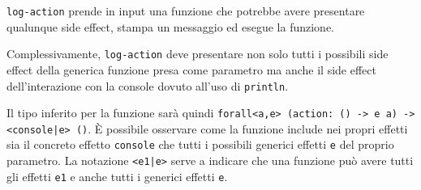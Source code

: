 \lstinline{log-action} prende in input una funzione che potrebbe avere presentare qualunque side effect, stampa un messaggio ed esegue la funzione.

Complessivamente, \lstinline{log-action} deve presentare non solo tutti i possibili side effect della generica funzione presa come parametro ma anche il side effect dell'interazione con la console dovuto all'uso di \lstinline{println}.

Il tipo inferito per la funzione sarà quindi \lstinline{forall<a,e> (action: () -> e a) -> <console|e> ()}. È possibile osservare come la funzione include nei propri effetti sia il concreto effetto \lstinline{console} che tutti i possibili generici effetti \lstinline{e} del proprio parametro.
La notazione \lstinline{<e1|e>} serve a indicare che una funzione può avere tutti gli effetti \lstinline{e1} e anche tutti i generici effetti \lstinline{e}.
